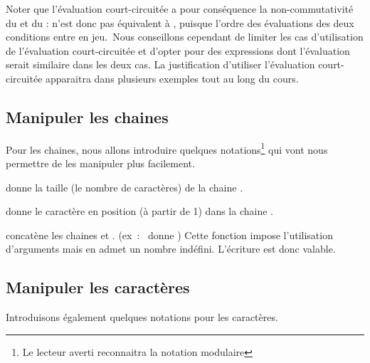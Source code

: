 			Noter que l’évaluation court-circuitée a pour conséquence la
			non-commutativité du  et du
			:  n’est donc
			pas équivalent à , puisque l’ordre
			des évaluations des deux conditions entre en jeu.~Nous conseillons
			cependant de limiter les cas d’utilisation de l’évaluation
			court-circuitée et d’opter pour des expressions dont
			l’évaluation serait similaire dans les deux cas. La justification
			d’utiliser l’évaluation court-circuitée apparaitra dans plusieurs
			exemples tout au long du cours.
	
		\subsection{Manipuler les chaines}
		
			Pour les chaines, nous allons introduire quelques notations\footnote{
			Le lecteur averti reconnaitra la notation modulaire}
			qui vont nous permettre de les manipuler plus facilement.
		
			\begin{liste}
			\item {}
				donne la taille (le nombre de caractères) de la chaine 
				.
			\item {}
				donne le caractère en position  
				(à partir de 1) dans la chaine .
			\item {}
				concatène les chaines  
				et .
				(ex~:~ donne )
				Cette fonction  impose l’utilisation d’arguments
				mais en admet un nombre indéfini. L’écriture 
				 est donc valable.
			\end{liste}
			

		\subsection{Manipuler les caractères}

			Introduisons également quelques notations pour les caractères.

